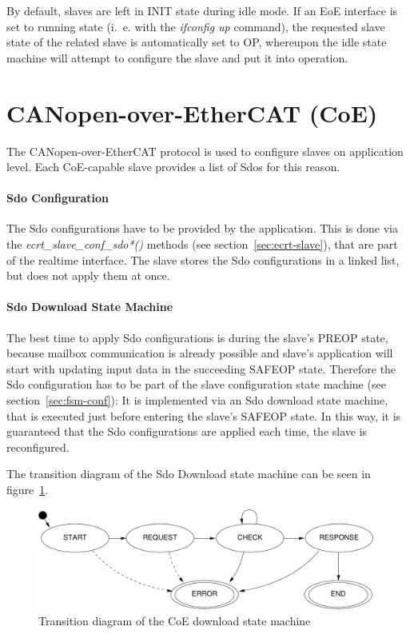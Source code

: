 \documentclass[a4paper,12pt,BCOR6mm,bibtotoc,idxtotoc]{scrbook}
\begin{document}
By default, slaves are left in INIT state during idle mode. If an EoE
interface is set to running state (i.~e. with the \textit{ifconfig up}
command), the requested slave state of the related slave is
automatically set to OP, whereupon the idle state machine will attempt
to configure the slave and put it into operation.


\section{CANopen-over-EtherCAT (CoE)}
\label{sec:coeimp}

The CANopen-over-EtherCAT protocol \cite[section~5.6]{alspec} is used
to configure slaves on application level. Each CoE-capable slave
provides a list of Sdos for this reason.

\paragraph{Sdo Configuration}

The Sdo configurations have to be provided by the application.  This is done
via the \textit{ecrt\_slave\_conf\_sdo*()} methods (see
section~\ref{sec:ecrt-slave}), that are part of the realtime interface. The
slave stores the Sdo configurations in a linked list, but does not apply them
at once.

\paragraph{Sdo Download State Machine}

The best time to apply Sdo configurations is during the slave's PREOP
state, because mailbox communication is already possible and slave's
application will start with updating input data in the succeeding
SAFEOP state. Therefore the Sdo configuration has to be part of the
slave configuration state machine (see section~\ref{sec:fsm-conf}): It
is implemented via an Sdo download state machine, that is executed
just before entering the slave's SAFEOP state. In this way, it is
guaranteed that the Sdo configurations are applied each time, the
slave is reconfigured.

The transition diagram of the Sdo Download state machine can be seen
in figure~\ref{fig:fsm-coedown}.

\begin{figure}[htbp]
  \centering
  \includegraphics[width=.9\textwidth]{images/fsm-coedown}
  \caption{Transition diagram of the CoE download state machine}
  \label{fig:fsm-coedown}
\end{figure}
\end{document}
